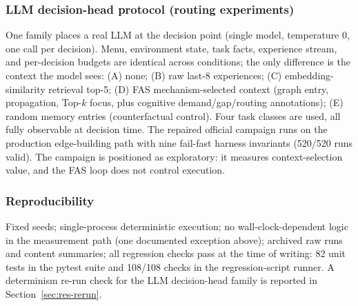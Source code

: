 \documentclass[10pt]{article}
\begin{document}
\subsubsection{LLM decision-head protocol (routing experiments)}
\label{sec:method-routing}
One family places a real LLM at the decision point (single model, temperature 0, one call per decision). Menu, environment state, task facts, experience stream, and per-decision budgets are identical across conditions; the only difference is the context the model sees: (A) none; (B) raw last-8 experiences; (C) embedding-similarity retrieval top-5; (D) FAS mechanism-selected context (graph entry, propagation, Top-$k$ focus, plus cognitive demand/gap/routing annotations); (E) random memory entries (counterfactual control). Four task classes are used, all fully observable at decision time. The repaired official campaign runs on the production edge-building path with nine fail-fast harness invariants (520/520 runs valid). The campaign is positioned as exploratory: it measures context-selection value, and the FAS loop does not control execution.

\subsubsection{Reproducibility}
Fixed seeds; single-process deterministic execution; no wall-clock-dependent logic in the measurement path (one documented exception above); archived raw runs and content summaries; all regression checks pass at the time of writing: 82 unit tests in the pytest suite and 108/108 checks in the regression-script runner. A determinism re-run check for the LLM decision-head family is reported in Section~\ref{sec:res-rerun}.
\end{document}
